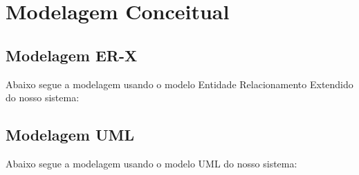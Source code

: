 \documentclass{article}
\begin{document}
\section{Modelagem Conceitual}

	\subsection{Modelagem ER-X}
	Abaixo segue a modelagem usando o modelo Entidade Relacionamento Extendido do nosso sistema:\\

	\subsection{Modelagem UML}
	Abaixo segue a modelagem usando o modelo UML do nosso sistema:\\
\end{document}

